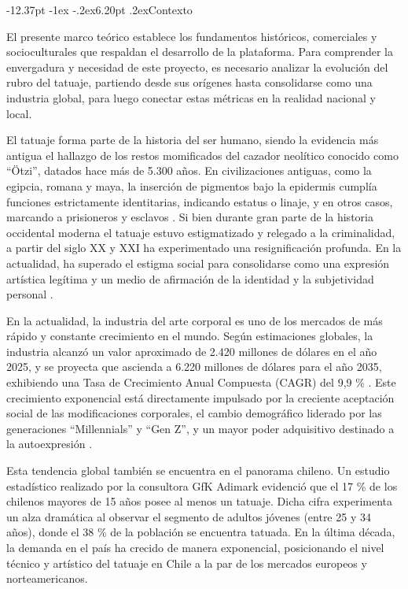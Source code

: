 \documentclass[12pt,letterpaper,oneside]{report}
\makeatletter
\renewcommand\section{\@startsection{section}{1}{\z@}%
  {-12.37pt \@plus -1ex \@minus -.2ex}{6.20pt \@plus.2ex}{\normalfont\large\bfseries}}
\makeatother
\begin{document}
\section{Contexto}

El presente marco teórico establece los fundamentos históricos, comerciales y socioculturales que respaldan el desarrollo de la plataforma. Para comprender la envergadura y necesidad de este proyecto, es necesario analizar la evolución del rubro del tatuaje, partiendo desde sus orígenes hasta consolidarse como una industria global, para luego conectar estas métricas en la realidad nacional y local.

El tatuaje forma parte de la historia del ser humano, siendo la evidencia más antigua el hallazgo de los restos momificados del cazador neolítico conocido como ``Ötzi'', datados hace más de 5.300 años. En civilizaciones antiguas, como la egipcia, romana y maya, la inserción de pigmentos bajo la epidermis cumplía funciones estrictamente identitarias, indicando estatus o linaje, y en otros casos, marcando a prisioneros y esclavos \cite{ballen2015}. Si bien durante gran parte de la historia occidental moderna el tatuaje estuvo estigmatizado y relegado a la criminalidad, a partir del siglo XX y XXI ha experimentado una resignificación profunda. En la actualidad, ha superado el estigma social para consolidarse como una expresión artística legítima y un medio de afirmación de la identidad y la subjetividad personal \cite{poulsen2021}.

En la actualidad, la industria del arte corporal es uno de los mercados de más rápido y constante crecimiento en el mundo. Según estimaciones globales, la industria alcanzó un valor aproximado de 2.420 millones de dólares en el año 2025, y se proyecta que ascienda a 6.220 millones de dólares para el año 2035, exhibiendo una Tasa de Crecimiento Anual Compuesta (CAGR) del 9,9 \% \cite{ide2026}. Este crecimiento exponencial está directamente impulsado por la creciente aceptación social de las modificaciones corporales, el cambio demográfico liderado por las generaciones ``Millennials'' y ``Gen Z'', y un mayor poder adquisitivo destinado a la autoexpresión \cite{ide2026}.

Esta tendencia global también se encuentra en el panorama chileno. Un estudio estadístico realizado por la consultora GfK Adimark evidenció que el 17 \% de los chilenos mayores de 15 años posee al menos un tatuaje. Dicha cifra experimenta un alza dramática al observar el segmento de adultos jóvenes (entre 25 y 34 años), donde el 38 \% de la población se encuentra tatuada. En la última década, la demanda en el país ha crecido de manera exponencial, posicionando el nivel técnico y artístico del tatuaje en Chile a la par de los mercados europeos y norteamericanos\cite{sepulveda2017}.
\end{document}

